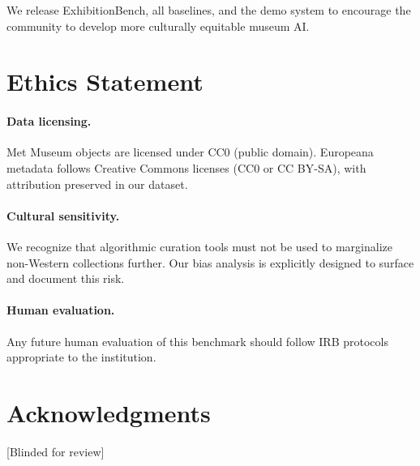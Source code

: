 \documentclass[11pt]{article}
\begin{document}
We release ExhibitionBench, all baselines, and the demo system to encourage
the community to develop more culturally equitable museum AI.

\section*{Ethics Statement}

\paragraph{Data licensing.}
Met Museum objects are licensed under CC0 (public domain).
Europeana metadata follows Creative Commons licenses (CC0 or CC BY-SA),
with attribution preserved in our dataset.

\paragraph{Cultural sensitivity.}
We recognize that algorithmic curation tools must not be used to marginalize
non-Western collections further.
Our bias analysis is explicitly designed to surface and document this risk.

\paragraph{Human evaluation.}
Any future human evaluation of this benchmark should follow IRB protocols
appropriate to the institution.

\section*{Acknowledgments}
[Blinded for review]



\end{document}
